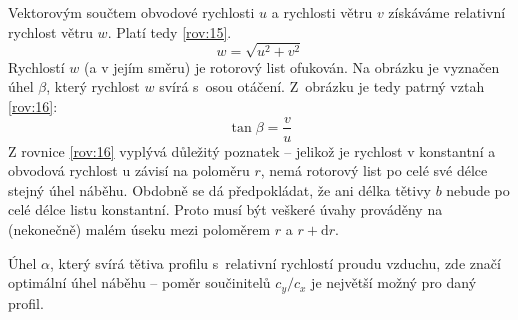 	Vektorovým součtem obvodové rychlosti $u$ a rychlosti větru $v$ získáváme relativní rychlost větru $w$. Platí tedy \eqref{rov:15}\cite{Rychetnik:Motory}.
	\begin{equation}
		\label{rov:15}
		w=\sqrt{u^2 + v^2}
	\end{equation}
	Rychlostí $w$ (a v jejím směru) je rotorový list ofukován. Na obrázku je vyznačen úhel $\beta$, který rychlost $w$ svírá s~osou otáčení. Z~obrázku je tedy patrný vztah \eqref{rov:16}\cite{Rychetnik:Motory}:
	\begin{equation}
		\label{rov:16}
		\tan{\beta}=\frac{v}{u}
	\end{equation}
	Z rovnice \eqref{rov:16} vyplývá důležitý poznatek – jelikož je rychlost v konstantní a obvodová rychlost u závisí na poloměru $r$, nemá rotorový list po celé své délce stejný úhel náběhu. Obdobně se dá předpokládat, že ani délka tětivy $b$ nebude po celé délce listu konstantní. Proto musí být veškeré úvahy prováděny na (nekonečně) malém úseku mezi poloměrem $r$ a $r + \mathrm{d}r$.
	
	Úhel $\alpha$, který svírá tětiva profilu s~relativní rychlostí proudu vzduchu, zde značí optimální úhel náběhu – poměr součinitelů $c_y/c_x$ je největší možný pro daný profil.
	
